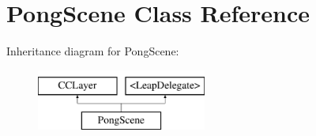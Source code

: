 \hypertarget{interface_pong_scene}{\section{Pong\-Scene Class Reference}
\label{d4/d8f/interface_pong_scene}
}
Inheritance diagram for Pong\-Scene\-:\begin{figure}[H]
\begin{center}
\leavevmode
\includegraphics[height=2.000000cm]{d4/d8f/interface_pong_scene}
\end{center}
\end{figure}
